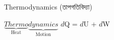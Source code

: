 \documentclass{article}
\begin{document}
\def\iangle{30} %

\def\down{-90}
\def\arcr{0.5cm} %
\begin{center}
\begin{Large}
Thermodynamics (তাপগতিবিদ্যা)
\end{Large}
\end{center}
$\underbrace{Thermo}_\text{Heat}\underbrace{dynamics}_\text{Motion}$
$d$Q = $d$U + $d$W
\end{document}

